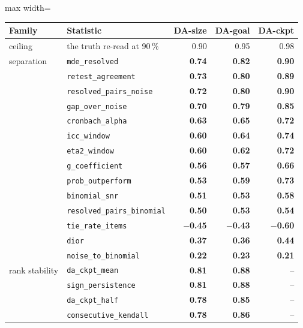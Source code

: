 \begin{table}[t]
\centering
\scriptsize
\begin{adjustbox}{max width=\textwidth}
\begin{tabular}{@{}llrrr@{}}
\toprule
\textbf{Family} & \textbf{Statistic} & \textbf{DA-size} & \textbf{DA-goal} & \textbf{DA-ckpt} \\
\midrule
ceiling & the truth re-read at 90\,\% & 0.90 & 0.95 & 0.98 \\
\midrule
separation & \texttt{mde\_resolved} & \textbf{0.74} & \textbf{0.82} & \textbf{0.90} \\
 & \texttt{retest\_agreement} & \textbf{0.73} & \textbf{0.80} & \textbf{0.89} \\
 & \texttt{resolved\_pairs\_noise} & \textbf{0.72} & \textbf{0.80} & \textbf{0.90} \\
 & \texttt{gap\_over\_noise} & \textbf{0.70} & \textbf{0.79} & \textbf{0.85} \\
 & \texttt{cronbach\_alpha} & \textbf{0.63} & \textbf{0.65} & \textbf{0.72} \\
 & \texttt{icc\_window} & \textbf{0.60} & \textbf{0.64} & \textbf{0.74} \\
 & \texttt{eta2\_window} & \textbf{0.60} & \textbf{0.62} & \textbf{0.72} \\
 & \texttt{g\_coefficient} & \textbf{0.56} & \textbf{0.57} & \textbf{0.66} \\
 & \texttt{prob\_outperform} & \textbf{0.53} & \textbf{0.59} & \textbf{0.73} \\
 & \texttt{binomial\_snr} & \textbf{0.51} & \textbf{0.53} & \textbf{0.58} \\
 & \texttt{resolved\_pairs\_binomial} & \textbf{0.50} & \textbf{0.53} & \textbf{0.54} \\
 & \texttt{tie\_rate\_items} & \textbf{$-$0.45} & \textbf{$-$0.43} & \textbf{$-$0.60} \\
 & \texttt{dior} & \textbf{0.37} & \textbf{0.36} & \textbf{0.44} \\
 & \texttt{noise\_to\_binomial} & \textbf{0.22} & \textbf{0.23} & \textbf{0.21} \\
\midrule
rank stability & \texttt{da\_ckpt\_mean} & \textbf{0.81} & \textbf{0.88} & -- \\
 & \texttt{sign\_persistence} & \textbf{0.81} & \textbf{0.88} & -- \\
 & \texttt{da\_ckpt\_half} & \textbf{0.78} & \textbf{0.85} & -- \\
 & \texttt{consecutive\_kendall} & \textbf{0.78} & \textbf{0.86} & -- \\

\end{tabular}
\end{adjustbox}
\end{table}
